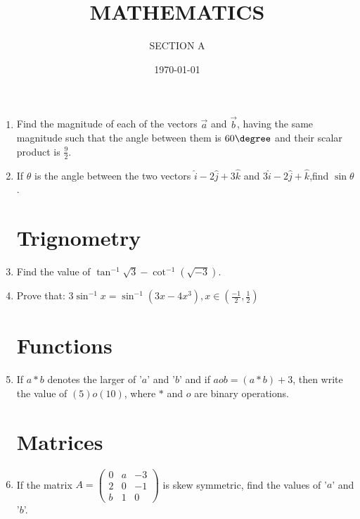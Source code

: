 \documentclass[10pt,-letter paper]{article}
\title{MATHEMATICS}
\author{SECTION A}
\date{\today}
\providecommand{\brak}[1]{\ensuremath{\left(#1\right)}}
\newcommand{\myvec}[1]{\ensuremath{\begin{pmatrix}#1\end{pmatrix}}}
\begin{document}
\maketitle

\begin{enumerate}
\section{Vector Algebra}
\item Find the magnitude of each of the vectors $\overrightarrow{a}$ and $\overrightarrow{b}$, having the same magnitude such that the angle between them is ${60\degree}$ and their scalar product is $\frac{9}{2}$.
\item If $\theta$ is the angle between the two vectors $\hat{i}-2\hat{j}+3\hat{k}$ and $3\hat{i}-2\hat{j}+\hat{k}$,find $\sin\theta$.




\section{Trignometry}
\item Find the value of $\tan^{-1}\sqrt{3}-\cot^{-1}\brak{\sqrt{-3}}$.
\item Prove that:                                         $3\sin^{-1}x=\sin^{-1}\brak{3x-4x^3}, x\in\brak{\frac{-1}{2},\frac{1}{2}}$
                    


\section{Functions}
\item  If $a*b$ denotes the larger of '$a$' and '$b$' and if $a o b = \brak{a * b} + 3$, then write the value of $\brak{5} o \brak{10}$, where $*$ and $o$ are binary operations.
    




\section{Matrices}	
\item  If the matrix $A = \myvec{ 0 & a & -3 \\ 2 & 0 & -1 \\ b & 1 & 0 }$ is skew symmetric, find the values of '$a$' and '$b$'.






\end{enumerate}
\end{document}
